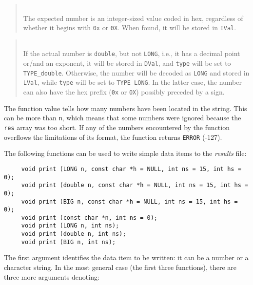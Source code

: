 \begin{quote}
\noindent{}\\ \hspace{0in}
The expected number is an integer-sized value
coded in hex, regardless of whether it begins with {\tt 0x} or {\tt 0X}.
When found, it will be stored in {\tt IVal}.
\end{quote}

\begin{quote}
\noindent{}\\ \hspace{0in}
If the actual number is {\tt double}, but not {\tt LONG}, i.e., it has a decimal
point or/and an exponent, it will be stored in {\tt DVal}, and {\tt type}
will be set to {\tt TYPE\_double}.
Otherwise, the number will be decoded as {\tt LONG} and stored in {\tt LVal},
while {\tt type} will be set to {\tt TYPE\_LONG}.
In the latter case, the number can also have the hex prefix ({\tt 0x} or
{\tt 0X}) possibly preceded by a sign.
\end{quote}

The function value tells how many numbers have been located in the string.
This can be more than {\tt n}, which means that some numbers were ignored
because the {\tt res} array was too short.
If any of the numbers encountered by the function overflows the limitations
of its format, the function returns {\tt ERROR} (-127).

\medskip

The following functions can be used to write simple data items
to the {\em results\/} file:
\begin{verbatim}
     void print (LONG n, const char *h = NULL, int ns = 15, int hs = 0);
     void print (double n, const char *h = NULL, int ns = 15, int hs = 0);
     void print (BIG n, const char *h = NULL, int ns = 15, int hs = 0);
     void print (const char *n, int ns = 0);
     void print (LONG n, int ns);
     void print (double n, int ns);
     void print (BIG n, int ns);
\end{verbatim}

The first argument identifies the data item to be written: it can be a
number or a character string.
In the most general case (the first three functions), there are three more
arguments denoting:

\medskip

